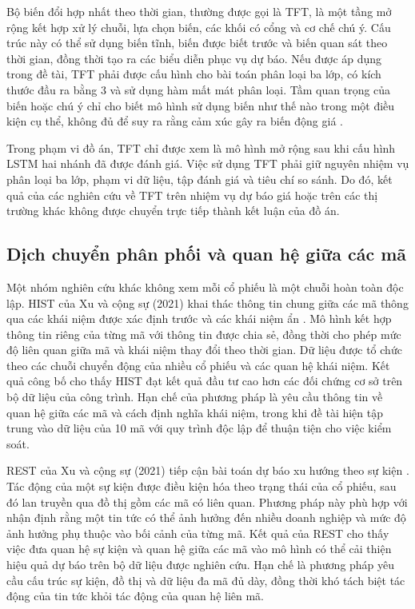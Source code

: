 \documentclass[12pt, a4paper, oneside]{report}
\begin{document}
Bộ biến đổi hợp nhất theo thời gian, thường được gọi là TFT, là một tầng mở rộng kết hợp xử lý chuỗi, lựa chọn biến, các khối có cổng và cơ chế chú ý. Cấu trúc này có thể sử dụng biến tĩnh, biến được biết trước và biến quan sát theo thời gian, đồng thời tạo ra các biểu diễn phục vụ dự báo. Nếu được áp dụng trong đề tài, TFT phải được cấu hình cho bài toán phân loại ba lớp, có kích thước đầu ra bằng 3 và sử dụng hàm mất mát phân loại. Tầm quan trọng của biến hoặc chú ý chỉ cho biết mô hình sử dụng biến như thế nào trong một điều kiện cụ thể, không đủ để suy ra rằng cảm xúc gây ra biến động giá \cite{Lim2021_tft}.

Trong phạm vi đồ án, TFT chỉ được xem là mô hình mở rộng sau khi cấu hình LSTM hai nhánh đã được đánh giá. Việc sử dụng TFT phải giữ nguyên nhiệm vụ phân loại ba lớp, phạm vi dữ liệu, tập đánh giá và tiêu chí so sánh. Do đó, kết quả của các nghiên cứu về TFT trên nhiệm vụ dự báo giá hoặc trên các thị trường khác không được chuyển trực tiếp thành kết luận của đồ án.

\subsection{Dịch chuyển phân phối và quan hệ giữa các mã}

Một nhóm nghiên cứu khác không xem mỗi cổ phiếu là một chuỗi hoàn toàn độc lập. HIST của Xu và cộng sự (2021) khai thác thông tin chung giữa các mã thông qua các khái niệm được xác định trước và các khái niệm ẩn \cite{Xu2021_211013716v2}. Mô hình kết hợp thông tin riêng của từng mã với thông tin được chia sẻ, đồng thời cho phép mức độ liên quan giữa mã và khái niệm thay đổi theo thời gian. Dữ liệu được tổ chức theo các chuỗi chuyển động của nhiều cổ phiếu và các quan hệ khái niệm. Kết quả công bố cho thấy HIST đạt kết quả đầu tư cao hơn các đối chứng cơ sở trên bộ dữ liệu của công trình. Hạn chế của phương pháp là yêu cầu thông tin về quan hệ giữa các mã và cách định nghĩa khái niệm, trong khi đề tài hiện tập trung vào dữ liệu của 10 mã với quy trình độc lập để thuận tiện cho việc kiểm soát.

REST của Xu và cộng sự (2021) tiếp cận bài toán dự báo xu hướng theo sự kiện \cite{Xu2021_210207372v2}. Tác động của một sự kiện được điều kiện hóa theo trạng thái của cổ phiếu, sau đó lan truyền qua đồ thị gồm các mã có liên quan. Phương pháp này phù hợp với nhận định rằng một tin tức có thể ảnh hưởng đến nhiều doanh nghiệp và mức độ ảnh hưởng phụ thuộc vào bối cảnh của từng mã. Kết quả của REST cho thấy việc đưa quan hệ sự kiện và quan hệ giữa các mã vào mô hình có thể cải thiện hiệu quả dự báo trên bộ dữ liệu được nghiên cứu. Hạn chế là phương pháp yêu cầu cấu trúc sự kiện, đồ thị và dữ liệu đa mã đủ dày, đồng thời khó tách biệt tác động của tin tức khỏi tác động của quan hệ liên mã.
\end{document}
